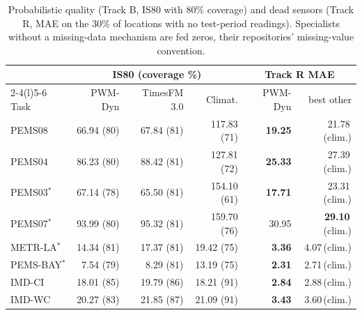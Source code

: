 \begin{table}[t]
\caption{Probabilistic quality (Track B, IS80 with 80\% coverage) and dead sensors (Track R, MAE on the 30\% of locations with no test-period readings). Specialists without a missing-data mechanism are fed zeros, their repositories' missing-value convention.}
\label{tab:prob}
\small
\setlength{\tabcolsep}{3pt}
\begin{tabular}{@{}lrrrrr@{}}
\toprule
 & \multicolumn{3}{c}{IS80 (coverage \%)} & \multicolumn{2}{c}{Track R MAE} \\
\cmidrule(lr){2-4}\cmidrule(l){5-6}
Task & PWM-Dyn & TimesFM 3.0 & Climat. & PWM-Dyn & best other \\
\midrule
PEMS08 & 66.94 (80) & 67.84 (81) & 117.83 (71) & \textbf{19.25} & 21.78\,{\scriptsize(clim.)} \\
PEMS04 & 86.23 (80) & 88.42 (81) & 127.81 (72) & \textbf{25.33} & 27.39\,{\scriptsize(clim.)} \\
PEMS03$^\ast$ & 67.14 (78) & 65.50 (81) & 154.10 (61) & \textbf{17.71} & 23.31\,{\scriptsize(clim.)} \\
PEMS07$^\ast$ & 93.99 (80) & 95.32 (81) & 159.70 (76) & 30.95 & \textbf{29.10}\,{\scriptsize(clim.)} \\
METR-LA$^\ast$ & 14.34 (81) & 17.37 (81) & 19.42 (75) & \textbf{3.36} & 4.07\,{\scriptsize(clim.)} \\
PEMS-BAY$^\ast$ & 7.54 (79) & 8.29 (81) & 13.19 (75) & \textbf{2.31} & 2.71\,{\scriptsize(clim.)} \\
IMD-CI & 18.01 (85) & 19.79 (86) & 18.21 (91) & \textbf{2.84} & 2.88\,{\scriptsize(clim.)} \\
IMD-WC & 20.27 (83) & 21.85 (87) & 21.09 (91) & \textbf{3.43} & 3.60\,{\scriptsize(clim.)} \\
\bottomrule
\end{tabular}
\end{table}